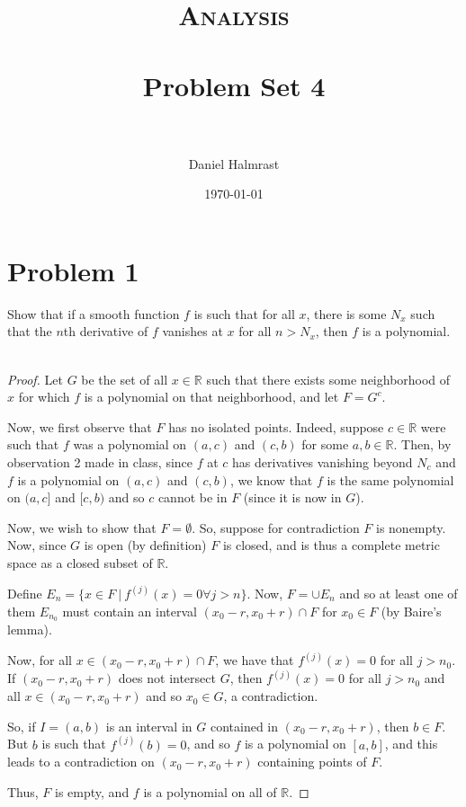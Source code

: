 \documentclass[fontsize=11pt]{scrartcl} %
\title{	
\normalfont \normalsize 
\textsc{Analysis} \\ [25pt] %
\horrule{0.5pt} \\[0.4cm] %
\huge Problem Set 4 \\ %
\horrule{2pt} \\[0.5cm] %
}
\author{Daniel Halmrast} %
\date{\normalsize\today} %
\numberwithin{equation}{section} %
\numberwithin{figure}{section} %
\numberwithin{table}{section} %
\newcommand{\R}{\mathbb{R}}
\begin{document}
\maketitle %

\section*{Problem 1}
Show that if a smooth function $f$ is such that for all $x$, there is some $N_x$
such that the $n$th derivative of $f$ vanishes at $x$ for all $n>N_x$, then $f$
is a polynomial.
\\
\\
\begin{proof}
Let $G$ be the set of all $x\in\R$ such that there exists some neighborhood of
$x$ for which $f$ is a polynomial on that neighborhood, and let $F=G^c$.

Now, we first observe that $F$ has no isolated points.
Indeed, suppose $c\in\R$ were such that $f$ was a polynomial on $(a,c)$ and
$(c,b)$ for some $a,b\in\R$. Then, by observation 2 made in class, since $f$ at
$c$ has derivatives vanishing beyond $N_c$ and $f$ is a polynomial on $(a,c)$
and $(c,b)$, we know that $f$ is the same polynomial on $(a,c]$ and $[c,b)$ and
so $c$ cannot be in $F$ (since it is now in $G$).

Now, we wish to show that $F=\emptyset$. So, suppose for contradiction $F$ is
nonempty. Now, since $G$ is open (by definition) $F$ is closed, and is thus a
complete metric space as a closed subset of $\R$.

Define $E_n = \{x\in F\ |\ f^{(j)}(x) = 0 \forall j>n\}$. Now, $F = \cup E_n$
and so at least one of them $E_{n_0}$ must contain an interval
$(x_0-r,x_0+r)\cap F$ for $x_0\in F$ (by Baire's lemma).

Now, for all $x\in (x_0-r,x_0+r)\cap F$, we have that $f^{(j)}(x) = 0$ for all
$j>n_0$. If $(x_0-r,x_0+r)$ does not intersect $G$, then $f^{(j)}(x) = 0$ for
all $j>n_0$ and all $x\in (x_0-r,x_0+r)$ and so $x_0\in G$, a contradiction.

So, if $I=(a,b)$ is an interval in $G$ contained in $(x_0-r,x_0+r)$, then $b\in
F$. But $b$ is such that $f^{(j)}(b) = 0$, and so $f$ is a polynomial on
$[a,b]$, and this leads to a contradiction on $(x_0-r,x_0+r)$ containing points
of $F$.

Thus, $F$ is empty, and $f$ is a polynomial on all of $\R$.
\end{proof}
\end{document}
